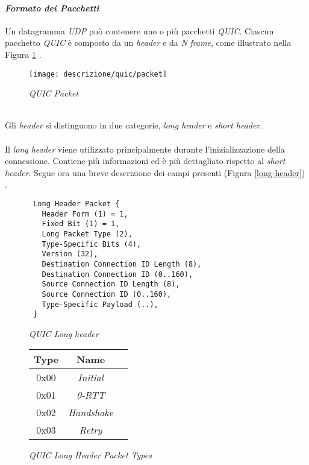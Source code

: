 \paragraph{\textit{Formato dei Pacchetti}}
\noindent Un datagramma \emph{UDP} può contenere uno o più pacchetti \emph{QUIC}. Ciascun pacchetto \emph{QUIC} è composto da un \emph{header} e da \emph{N} \emph{frame}, come illustrato nella Figura \ref{quic-packet} \cite{site:rfc9000}.
\begin{figure}[!h]
    \centering
    \texttt{[image: descrizione/quic/packet]}
    \caption{\emph{QUIC Packet}}
    \label{quic-packet}
\end{figure}
\\
Gli \emph{header} si distinguono in due categorie, \emph{long header} e \emph{short header}. 
\\\\
Il \emph{long header} viene utilizzato principalmente durante l'inizializzazione della connessione. Contiene più informazioni ed è più dettagliato rispetto al \emph{short header}. Segue ora una breve descrizione dei campi presenti (Figura \ref{long-header}) \cite{site:rfc9000}.
\begin{figure}[!h]
    \centering
    \begin{minipage}{0.48\textwidth}
        \centering
        \begin{small}
        \begin{BVerbatim}
 Long Header Packet {
   Header Form (1) = 1,
   Fixed Bit (1) = 1,
   Long Packet Type (2),
   Type-Specific Bits (4),
   Version (32),
   Destination Connection ID Length (8),
   Destination Connection ID (0..160),
   Source Connection ID Length (8),
   Source Connection ID (0..160),
   Type-Specific Payload (..),
 }
        \end{BVerbatim}
    \end{small}
        \caption{\emph{QUIC Long header}}
        \label{long-header}
    \end{minipage}
    \hfill
    \begin{minipage}{0.48\textwidth}
        \centering
        \begin{tabular}{|c|c|c|}
            \hline
            \textbf{Type} & \textbf{Name}  \\
            \hline
            0x00 & \emph{Initial} \\
            \hline
            0x01 & \emph{0-RTT}  \\
            \hline
            0x02 & \emph{Handshake}   \\
            \hline
            0x03 & \emph{Retry}  \\
            \hline
            \end{tabular}
        \caption{\emph{QUIC Long Header Packet Types}}
        \label{packet-type}
    \end{minipage}
\end{figure}

